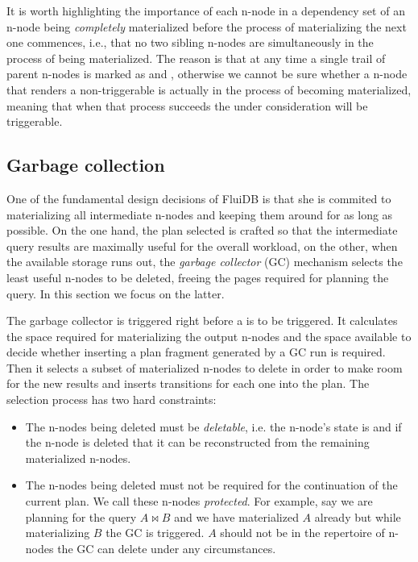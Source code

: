 It is worth highlighting the importance of each n-node in a dependency set of an n-node
being \emph{completely} materialized before the process of materializing the
next one commences, i.e., that no two sibling n-nodes are
simultaneously in the process of being materialized. The reason is
that at any time a single trail of parent n-nodes is marked as
 and , otherwise we cannot be sure whether a
 n-node that renders a 
non-triggerable is actually in the process of becoming materialized,
meaning that when that process succeeds the  under
consideration will be triggerable.

\subsection{Garbage collection}
\label{sec:gc}

One of the fundamental design decisions of FluiDB is that she is
commited to materializing all intermediate n-nodes and keeping them
around for as long as possible. On the one hand, the plan selected is
crafted so that the intermediate query results are maximally useful for the
overall workload, on the other, when the available storage runs out,
the \emph{garbage collector} (GC) mechanism selects the least useful n-nodes to be
deleted, freeing the pages required for planning the query. In this section
we focus on the latter.

The garbage collector is triggered right before a  is to
be triggered. It calculates the space required for materializing the
output n-nodes and the space available to decide whether inserting a
plan fragment generated by a GC run is required. Then it selects a
subset of materialized n-nodes to delete in order to make room for the
new results and inserts  transitions for each one into the
plan. The selection process has two hard constraints:

\begin{itemize}
\item The n-nodes being deleted must be \emph{deletable}, i.e. the
  n-node's state is  and if the n-node is deleted that it
  can be reconstructed from the remaining materialized n-nodes.
\item The n-nodes being deleted must not be required for the
  continuation of the current plan. We call these n-nodes
  \emph{protected}. For example, say we are planning for the query
  \(A \Join B\) and we have materialized \(A\) already but while
  materializing \(B\) the GC is triggered. \(A\) should not be in the
  repertoire of n-nodes the GC can delete under any circumstances.
\end{itemize}

